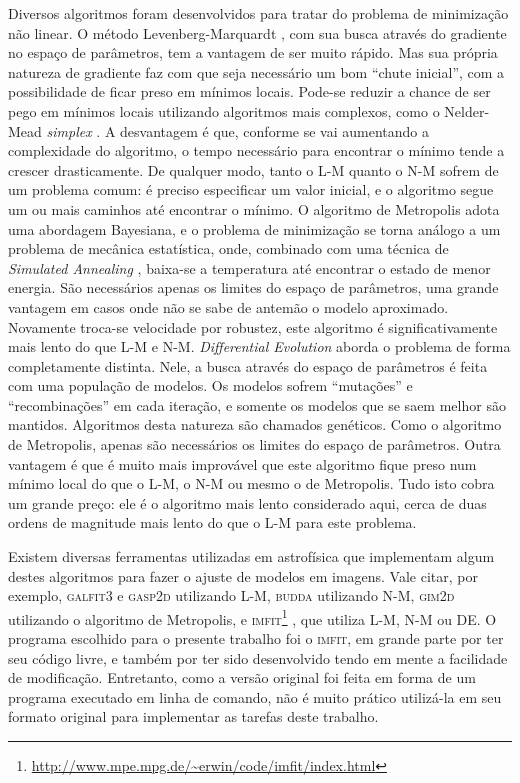 Diversos algoritmos foram desenvolvidos para tratar do problema de minimização
não linear. O método Levenberg-Marquardt \citep[daqui em diante
L-M]{Levenberg1944, Marquardt1963}, com sua busca através do gradiente no espaço
de parâmetros, tem a vantagem de ser muito rápido. Mas sua própria natureza de
gradiente faz com que seja necessário um bom ``chute inicial'', com a
possibilidade de ficar preso em mínimos locais. Pode-se reduzir a chance de ser
pego em mínimos locais utilizando algoritmos mais complexos, como o Nelder-Mead
{\em simplex} \citep[daqui em diante N-M]{Nelder1965}. A desvantagem é que,
conforme se vai aumentando a complexidade do algoritmo, o tempo necessário para
encontrar o mínimo tende a crescer drasticamente. De qualquer modo, tanto o L-M
quanto o N-M sofrem de um problema comum: é preciso especificar um valor
inicial, e o algoritmo segue um ou mais caminhos até encontrar o mínimo. O
algoritmo de Metropolis \citep{Metropolis1953, Saha1994} adota uma abordagem
Bayesiana, e o problema de minimização se torna análogo a um problema de
mecânica estatística, onde, combinado com uma técnica de {\em Simulated
Annealing} \citep{Kirkpatrick1983}, baixa-se a temperatura até encontrar o
estado de menor energia. São necessários apenas os limites do espaço de
parâmetros, uma grande vantagem em casos onde não se sabe de antemão o modelo
aproximado. Novamente troca-se velocidade por robustez, este algoritmo é
significativamente mais lento do que L-M e N-M. {\em Differential Evolution}
\citep[daqui em diante DE]{Storn1997} aborda o problema de forma completamente
distinta. Nele, a busca através do espaço de parâmetros é feita com uma
população de modelos. Os modelos sofrem ``mutações'' e ``recombinações'' em cada
iteração, e somente os modelos que se saem melhor são mantidos. Algoritmos desta
natureza são chamados genéticos. Como o algoritmo de Metropolis, apenas são
necessários os limites do espaço de parâmetros. Outra vantagem é que é muito
mais improvável que este algoritmo fique preso num mínimo local do que o L-M, o
N-M ou mesmo o de Metropolis. Tudo isto cobra um grande preço: ele é o algoritmo
mais lento considerado aqui, cerca de duas ordens de magnitude mais lento do que
o L-M para este problema.

Existem diversas ferramentas utilizadas em astrofísica que implementam algum
destes algoritmos para fazer o ajuste de modelos em imagens. Vale citar, por
exemplo, \textsc{galfit3} \citep{Peng2010} e \textsc{gasp2d}
\citep{MendezAbreu2008} utilizando L-M, \textsc{budda} \citep{DeSouza2004}
utilizando N-M, \textsc{gim2d} \citep{Simard2002} utilizando o algoritmo de
Metropolis, e
\textsc{imfit}\footnote{\url{http://www.mpe.mpg.de/~erwin/code/imfit/index.html}}
\citet{Erwin2015}, que utiliza L-M, N-M ou DE. O programa escolhido para o
presente trabalho foi o \textsc{imfit}, em grande parte por ter seu código
livre, e também por ter sido desenvolvido tendo em mente a facilidade de modificação.
Entretanto, como a versão original foi feita em forma de um programa executado
em linha de comando, não é muito prático utilizá-la em seu formato original para
implementar as tarefas deste trabalho.

